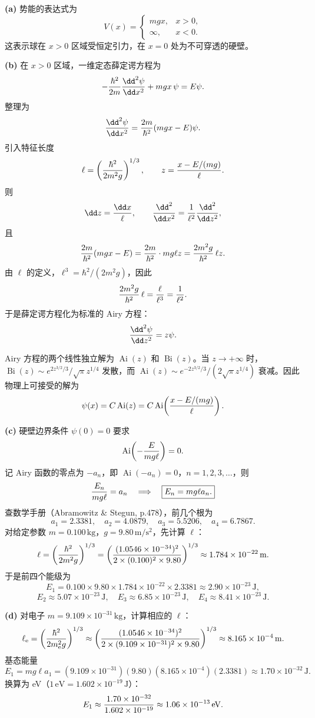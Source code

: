 \begin{solution}
\textbf{(a)} 势能的表达式为
\[
V(x)=\begin{cases}mgx, & x>0,\\ \infty, & x<0.\end{cases}
\]
这表示球在 $x>0$ 区域受恒定引力，在 $x=0$ 处为不可穿透的硬壁。

\textbf{(b)} 在 $x>0$ 区域，一维定态薛定谔方程为
\[
-{\hbar^2\over2m}{\dd^2\psi\over\dd x^2}+mgx\,\psi=E\psi.
\]
整理为
\[
{\dd^2\psi\over\dd x^2}={2m\over\hbar^2}(mgx-E)\psi.
\]
引入特征长度
\[
\ell=\left({\hbar^2\over2m^2g}\right)^{1/3},
\qquad
z={x-E/(mg)\over\ell}.
\]
则
\[
\dd z={\dd x\over\ell},\qquad
{\dd^2\over\dd x^2}={1\over\ell^2}{\dd^2\over\dd z^2},
\]
且
\[
{2m\over\hbar^2}(mgx-E)
={2m\over\hbar^2}\cdot mg\ell z
={2m^2g\over\hbar^2}\,\ell z.
\]
由 $\ell$ 的定义，$\ell^3=\hbar^2/(2m^2g)$，因此
\[
{2m^2g\over\hbar^2}\,\ell={\ell\over\ell^3}={1\over\ell^2}.
\]
于是薛定谔方程化为标准的 Airy 方程：
\[
{\dd^2\psi\over\dd z^2}=z\psi.
\]

Airy 方程的两个线性独立解为 $\operatorname{Ai}(z)$ 和 $\operatorname{Bi}(z)$。当 $z\to+\infty$ 时，$\operatorname{Bi}(z)\sim e^{2z^{3/2}/3}/\sqrt{\pi}z^{1/4}$ 发散，而 $\operatorname{Ai}(z)\sim e^{-2z^{3/2}/3}/(2\sqrt{\pi}z^{1/4})$ 衰减。因此物理上可接受的解为
\[
\psi(x)=C\operatorname{Ai}(z)=C\operatorname{Ai}\!\left({x-E/(mg)\over\ell}\right).
\]

\textbf{(c)} 硬壁边界条件 $\psi(0)=0$ 要求
\[
\operatorname{Ai}\!\left(-{E\over mg\ell}\right)=0.
\]
记 Airy 函数的零点为 $-a_n$，即 $\operatorname{Ai}(-a_n)=0$，$n=1,2,3,\ldots$，则
\[
{E_n\over mg\ell}=a_n\quad\Longrightarrow\quad
\boxed{E_n=mg\ell a_n.}
\]
查数学手册（Abramowitz \& Stegun, p.478），前几个根为
\[
a_1=2.3381,\quad a_2=4.0879,\quad a_3=5.5206,\quad a_4=6.7867.
\]
对给定参数 $m=0.100\,\mathrm{kg}$，$g=9.80\,\mathrm{m/s^2}$，先计算 $\ell$：
\[
\ell=\left({\hbar^2\over2m^2g}\right)^{1/3}
=\left({(1.0546\times10^{-34})^2\over2\times(0.100)^2\times9.80}\right)^{1/3}
\approx 1.784\times10^{-22}\,\mathrm{m}.
\]
于是前四个能级为
\[
E_1=0.100\times9.80\times1.784\times10^{-22}\times2.3381
\approx 2.90\times10^{-23}\,\mathrm{J},
\]
\[
E_2\approx 5.07\times10^{-23}\,\mathrm{J},\quad
E_3\approx 6.85\times10^{-23}\,\mathrm{J},\quad
E_4\approx 8.41\times10^{-23}\,\mathrm{J}.
\]

\textbf{(d)} 对电子 $m=9.109\times10^{-31}\,\mathrm{kg}$，计算相应的 $\ell$：
\[
\ell_{\rm e}=\left({\hbar^2\over2m_{\rm e}^2g}\right)^{1/3}
\approx\left({(1.0546\times10^{-34})^2\over2\times(9.109\times10^{-31})^2\times9.80}\right)^{1/3}
\approx 8.165\times10^{-4}\,\mathrm{m}.
\]
基态能量
\[
E_1=mg\ell a_1
=(9.109\times10^{-31})(9.80)(8.165\times10^{-4})(2.3381)
\approx 1.70\times10^{-32}\,\mathrm{J}.
\]
换算为 eV（$1\,\mathrm{eV}=1.602\times10^{-19}\,\mathrm{J}$）：
\[
E_1\approx {1.70\times10^{-32}\over1.602\times10^{-19}}
\approx 1.06\times10^{-13}\,\mathrm{eV}.
\]


\end{solution}
